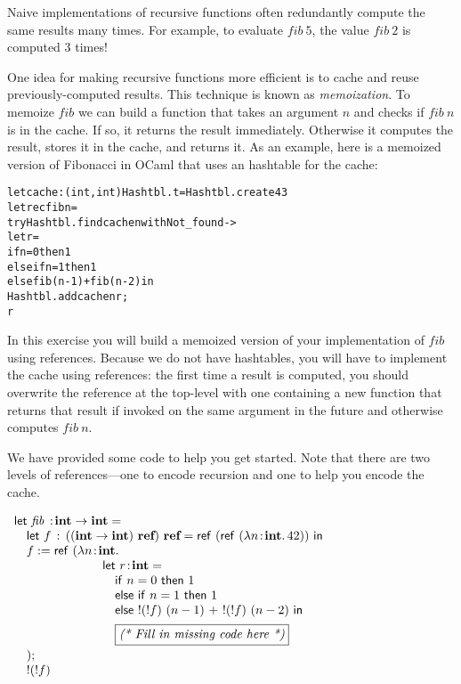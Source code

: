 \documentclass[10pt]{article}
\begin{document}
\begin{exercise}
Naive implementations of recursive functions often redundantly compute
the same results many times. For example, to evaluate
$\mathit{fib}~5$, the value $\mathit{fib}~2$ is computed $3$ times!

One idea for making recursive functions more efficient is to cache and
reuse previously-computed results. This technique is known as
\emph{memoization}. To memoize $\mathit{fib}$ we can build a function
that takes an argument $n$ and checks if $\mathit{fib}~n$ is in the
cache. If so, it returns the result immediately. Otherwise it computes
the result, stores it in the cache, and returns it. As an example,
here is a memoized version of Fibonacci in OCaml that uses an
hashtable for the cache:
%
\begin{alltt}
    let cache : (int,int) Hashtbl.t = Hashtbl.create 43
    let rec fib n =
      try Hashtbl.find cache n with Not_found -> 
        let r = 
          if n = 0 then 1
          else if n = 1 then 1 
          else fib (n-1) + fib (n-2) in
        Hashtbl.add cache n r; 
        r  
\end{alltt}

\noindent In this exercise you will build a memoized version of your
implementation of $\mathit{fib}$ using references. Because we do not
have hashtables, you will have to implement the cache using
references: the first time a result is computed, you should overwrite
the reference at the top-level with one containing a new function that
returns that result if invoked on the same argument in the future and
otherwise computes $\mathit{fib}~n$.
 
We have provided some code to help you get started. Note that there
are two levels of references---one to encode recursion and one to help
you encode the cache.

\bigskip

\(
\begin{array}{l}
\lamfnt{let}~\mathit{fib}~\ty \typ{int} \arrow \typ{int} = \\
\quad \lamfnt{let}~f~\ty~((\typ{int} \arrow \typ{int})~\typ{ref})~\typ{ref} = \lamfnt{ref}~(\lamfnt{ref}~(\lam{n\ty\typ{int}}{42}))~\lamfnt{in}\\
\quad f := \lamfnt{ref}~(\lambda n\ty\typ{int}.\\
\hspace*{25mm} \lamfnt{let}~r \ty \typ{int} = \\
\hspace*{25mm} \quad \lamfnt{if}~n = 0~\lamfnt{then}~1\\ 
\hspace*{25mm} \quad \lamfnt{else}~\lamfnt{if}~n = 1~\lamfnt{then}~1\\ 
\hspace*{25mm} \quad \lamfnt{else}~!(!f)~(n-1)~+~!(!f)~(n-2)~\lamfnt{in}\\[.5em]
\hspace*{25mm} \quad \textit{\fbox{(* Fill in missing code here *)}}\\[.5em]
\quad );\\
\quad !(!f)
\end{array}
\)
\end{exercise}
\end{document}
